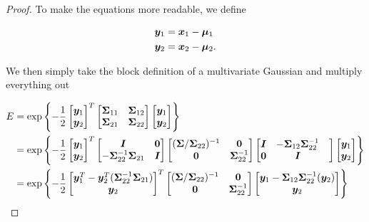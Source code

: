 \begin{proof}
    To make the equations more readable, we define 
    
    \begin{align}
        {\bm{y}}_1 &= {\bm{x}}_1 - {\bm{\mu}}_1 \\
        {\bm{y}}_2 &= {\bm{x}}_2 - {\bm{\mu}}_2.
    \end{align}
    
    We then simply take the block definition of a multivariate Gaussian and multiply everything out
    
    \begin{align}
        E &= \exp \left\lbrace -\frac{1}{2}
        \begin{bmatrix} \vy_1 \\ \vy_2 \end{bmatrix}^T
        \partsigma
        \begin{bmatrix} \vy_1 \\ \vy_2 \end{bmatrix} \right\rbrace \\
        &= \exp \left\lbrace -\frac{1}{2}
        \begin{bmatrix} \vy_1 \\ \vy_2 \end{bmatrix}^T
        \begin{bmatrix} \mI & \mZero \\ -\mSigma_{22}^{-1} \mSigma_{21} & \mI \end{bmatrix}
        \begin{bmatrix} (\mSigma/\mSigma_{22})^{-1} & \mZero \\ \mZero & \mSigma_{22}^{-1} \end{bmatrix}
        \begin{bmatrix} \mI & -\mSigma_{12} \mSigma_{22}^{-1} & \\ \mZero & \mI \end{bmatrix}
        \begin{bmatrix} \vy_1 \\ \vy_2 \end{bmatrix} \right\rbrace \\
        &= \exp \left\lbrace -\frac{1}{2}
        \begin{bmatrix} \vy_1^T - \vy_2^T (\mSigma_{22}^{-1} \mSigma_{21}) \\
        \vy_2
        \end{bmatrix}^T
        \begin{bmatrix} (\mSigma/\mSigma_{22})^{-1} & \mZero \\ \mZero & \mSigma_{22}^{-1} \end{bmatrix} \begin{bmatrix} \vy_1 -\mSigma_{12} \mSigma_{22}^{-1} (\vy_2) \\ \vy_2 \end{bmatrix} \right\rbrace \\

\end{align}
\end{proof}
